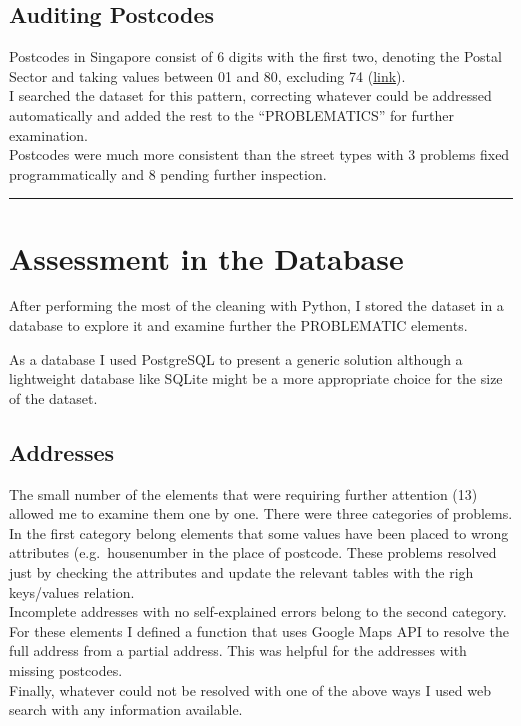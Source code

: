 \documentclass[11pt]{article}
\begin{document}
    \subsection*{Auditing Postcodes}\label{auditing-postcodes}

    Postcodes in Singapore consist of 6 digits with the first two, denoting
the Postal Sector and taking values between 01 and 80, excluding 74
(\href{https://www.ura.gov.sg/realEstateIIWeb/resources/misc/list_of_postal_districts.htm}{link}).\\
I searched the dataset for this pattern, correcting whatever could be
addressed automatically and added the rest to the ``PROBLEMATICS'' for
further examination.\\
Postcodes were much more consistent than the street types with 3
problems fixed programmatically and 8 pending further inspection.

    \begin{center}\color{brown}\rule{1\linewidth}{\linethickness}\end{center}

    \section*{Assessment in the Database}\label{assessment-in-the-database}

    After performing the most of the cleaning with Python, I stored the
dataset in a database to explore it and examine further the PROBLEMATIC
elements.

    As a database I used PostgreSQL to present a generic solution although a
lightweight database like SQLite might be a more appropriate choice for
the size of the dataset.

    \subsection*{Addresses}\label{addresses}

    The small number of the elements that were requiring further attention
(13) allowed me to examine them one by one. There were three categories of
problems.\\
In the first category belong elements that some values have been placed
to wrong attributes (e.g.~housenumber in the place of postcode. These
problems resolved just by checking the attributes and update the
relevant tables with the righ keys/values relation.\\
Incomplete addresses with no self-explained errors belong to the second
category. For these elements I defined a function that uses Google Maps
API to resolve the full address from a partial address. This was helpful
for the addresses with missing postcodes.\\
Finally, whatever could not be resolved with one of the above ways I
used web search with any information available.
\end{document}
